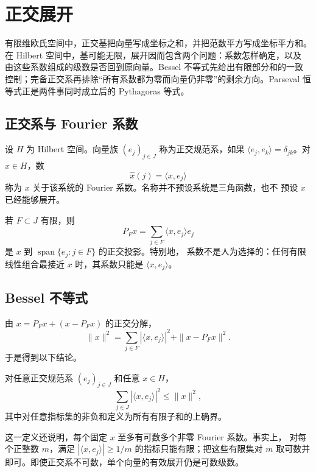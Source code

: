 \chapter{正交展开}
\label{chap:orthogonal-expansions}

有限维欧氏空间中，正交基把向量写成坐标之和，并把范数平方写成坐标平方和。
在 Hilbert 空间中，基可能无限，展开因而包含两个问题：系数怎样确定，以及
由这些系数组成的级数是否回到原向量。Bessel 不等式先给出有限部分和的一致
控制；完备正交系再排除“所有系数都为零而向量仍非零”的剩余方向。Parseval
恒等式正是两件事同时成立后的 Pythagoras 等式。

\section{正交系与 Fourier 系数}

设 \(H\) 为 Hilbert 空间。向量族 \((e_j)_{j\in J}\) 称为正交规范系，如果
\(\langle e_j,e_k\rangle=\delta_{jk}\)。对 \(x\in H\)，数
\[
 \widehat x(j)=\langle x,e_j\rangle
\]
称为 \(x\) 关于该系统的 Fourier 系数。名称并不预设系统是三角函数，也不
预设 \(x\) 已经能够展开。

若 \(F\subset J\) 有限，则
\[
 P_Fx=\sum_{j\in F}\langle x,e_j\rangle e_j
\]
是 \(x\) 到 \(\operatorname{span}\{e_j:j\in F\}\) 的正交投影。特别地，
系数不是人为选择的：任何有限线性组合最接近 \(x\) 时，其系数只能是
\(\langle x,e_j\rangle\)。

\section{Bessel 不等式}

由 \(x=P_Fx+(x-P_Fx)\) 的正交分解，
\[
 \|x\|^2=\sum_{j\in F}|\langle x,e_j\rangle|^2+\|x-P_Fx\|^2.
\]
于是得到以下结论。

\begin{theorem}\label{thm:bessel-inequality}
对任意正交规范系 \((e_j)_{j\in J}\) 和任意 \(x\in H\)，
\[
 \sum_{j\in J}|\langle x,e_j\rangle|^2\le\|x\|^2,
\]
其中对任意指标集的非负和定义为所有有限子和的上确界。
\end{theorem}

这一定义还说明，每个固定 \(x\) 至多有可数多个非零 Fourier 系数。事实上，
对每个正整数 \(m\)，满足
\(|\langle x,e_j\rangle|\ge1/m\) 的指标只能有限；把这些有限集对 \(m\)
取可数并即可。即使正交系不可数，单个向量的有效展开仍是可数级数。

